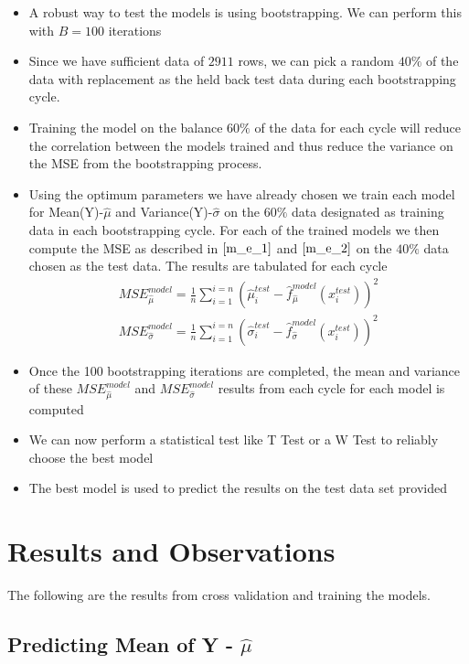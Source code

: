 \documentclass[twoside,12pt]{article}
\begin{document}
\begin{itemize}
\item
A robust way to test the models is using bootstrapping. We can perform this with $B=100$ iterations
\item
Since we have sufficient data of $2911$ rows, we can pick a random $40\%$ of the data with replacement as the held back test data during each bootstrapping cycle. 
\item
Training the model on the balance $60\%$ of the data for each cycle will reduce the correlation between the models trained and thus reduce the variance on the MSE from the bootstrapping process.
\item
Using the optimum parameters we have already chosen we train each model for Mean(Y)-$\hat{\mu}$ and Variance(Y)-$\hat{\sigma}$ on the $60\%$ data designated as training data in each bootstrapping cycle. For each of the trained models we then compute the MSE as described in $\eqref{m_e_1}$ and $\eqref{m_e_2}$ on the $40\%$ data chosen as the test data. The results are tabulated for each cycle
\begin{align}
MSE_{\hat{\mu}}^{model} = \frac{1}{n} \sum_{i=1}^{i=n}  \left( \hat{\mu}_i^{test}-\hat{f}_{\hat{\mu}}^{model}\left(x_i^{test}\right) \right)^2 \label{m_e_1}\\
MSE_{\hat{\sigma}}^{model} = \frac{1}{n} \sum_{i=1}^{i=n}  \left( \hat{\sigma}_i^{test}-\hat{f}_{\hat{\sigma}}^{model}\left(x_i^{test}\right) \right)^2 \label{m_e_2}
\end{align}
\item
Once the 100 bootstrapping iterations are completed, the mean and variance of these $MSE_{\hat{\mu}}^{model}$ and $MSE_{\hat{\sigma}}^{model}$ results from each cycle for each model is computed
\item
We can now perform a statistical test like T Test or a W Test to reliably choose the best model
\item
The best model is used to predict the results on the test data set provided
\end{itemize}




\section{Results and Observations}
\label{Results and Observations}

The following are the results from cross validation and training the models.
\subsection{Predicting Mean of Y - $\hat{\mu}$}
\end{document}
